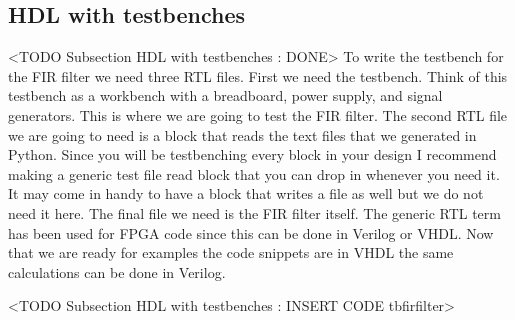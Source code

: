 	
\subsection{HDL with testbenches}
	<TODO Subsection HDL with testbenches : DONE>
\label{sec:hdlwtbs}
To write the testbench for the \ac{FIR} filter we need three \ac{RTL} files. First we need the testbench. Think of this testbench as a workbench with a breadboard, power supply, and signal generators. This is where we are going to test the \ac{FIR} filter. The second \ac{RTL} file we are going to need is a block that reads the text files that we generated in Python. Since you will be testbenching every block in your design I recommend making a generic test file read block that you can drop in whenever you need it. It may come in handy to have a block that writes a file as well but we do not need it here. The final file we need is the \ac{FIR} filter itself. The generic \ac{RTL} term has been used for \ac{FPGA} code since this can be done in Verilog or \ac{VHDL}. Now that we are ready for examples the code snippets are in \ac{VHDL} the same calculations can be done in Verilog.

<TODO Subsection HDL with testbenches : INSERT CODE tbfirfilter>

